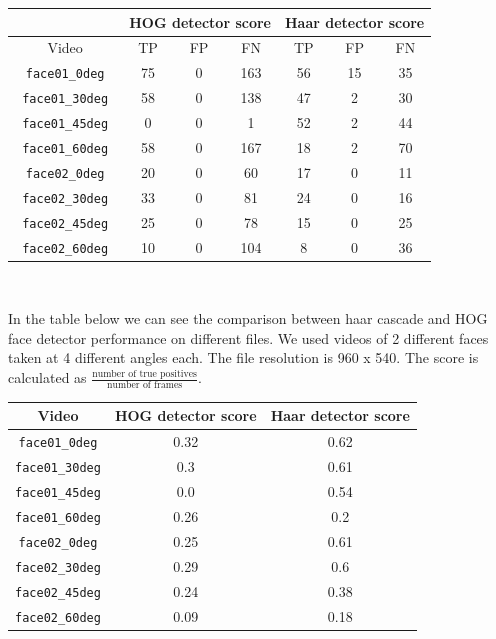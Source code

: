 \documentclass[12pt,a4paper]{report}
\begin{document}
	\begin{center}
		\begin{tabular}{|c|c|c|c|c|c|c|}
			\hline 
			& \multicolumn{3}{c|}{HOG detector score} & \multicolumn{3}{c|}{Haar detector score} \\
			\hline
			Video & TP & FP & FN & TP & FP & FN \\
			\hline 
			\texttt{ face01\_0deg } & 75 & 0 & 163 & 56 & 15 & 35 \\
			\texttt{ face01\_30deg } & 58 & 0 & 138 & 47 & 2 & 30 \\
			\texttt{ face01\_45deg } & 0 & 0 & 1 & 52 & 2 & 44 \\
			\texttt{ face01\_60deg } & 58 & 0 & 167 & 18 & 2 & 70 \\
			\texttt{ face02\_0deg } & 20 & 0 & 60 & 17 & 0 & 11 \\
			\texttt{ face02\_30deg } & 33 & 0 & 81 & 24 & 0 & 16 \\
			\texttt{ face02\_45deg } & 25 & 0 & 78 & 15 & 0 & 25 \\
			\texttt{ face02\_60deg } & 10 & 0 & 104 & 8 & 0 & 36 \\			
			\hline 
		\end{tabular} \\
	\end{center}
	
	In the table below we can see the comparison between haar cascade and HOG face detector performance on different files. We used videos of 2 different faces taken at 4 different angles each. The file resolution is 960 x 540. The score is calculated as $\frac{\text{number of true positives}}{\text{number of frames}}$.
	
	\begin{center}
			\begin{tabular}{|c|c|c|}
			\hline 
			Video & HOG detector score & Haar detector score \\
			\hline
			\texttt{face01\_0deg} & 0.32 & 0.62 \\
			\texttt{face01\_30deg} & 0.3 & 0.61 \\
			\texttt{face01\_45deg} & 0.0 & 0.54 \\
			\texttt{face01\_60deg} & 0.26 & 0.2 \\
			\texttt{face02\_0deg} & 0.25 & 0.61 \\
			\texttt{face02\_30deg} & 0.29 & 0.6 \\
			\texttt{face02\_45deg} & 0.24 & 0.38 \\
			\texttt{face02\_60deg} & 0.09 & 0.18 \\
			\hline 
		\end{tabular} \\
	\end{center}
\end{document}
